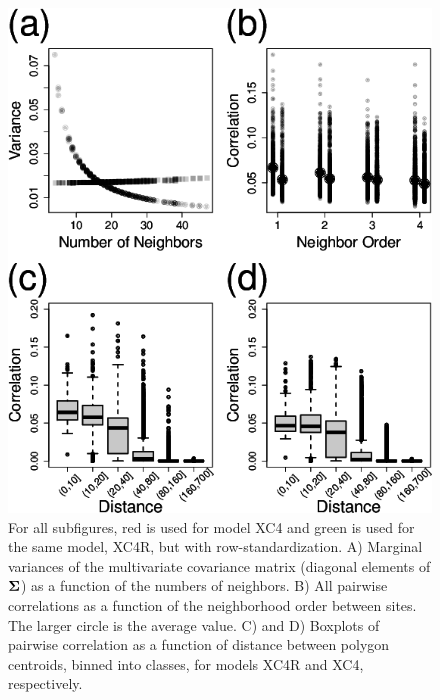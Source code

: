 \documentclass[11pt, titlepage]{article}\usepackage[]{graphicx}\usepackage[]{color}
\renewcommand{\theequation}{eqn \arabic{equation}}
\begin{document}
\begin{figure}[H]
  \begin{center}
  \includegraphics[width=.8\linewidth]{figure/Fig-MargVar.png}
  \end{center}
  \caption{For all subfigures, red is used for model XC4 and green is used for the same model, XC4R, but with row-standardization.  A) Marginal variances of the multivariate covariance matrix (diagonal elements of $\mbox{\boldmath $\Sigma$}$) as a function of the numbers of neighbors. B) All pairwise correlations as a function of the neighborhood order between sites.  The larger circle is the average value. C) and D) Boxplots of pairwise correlation as a function of distance between polygon centroids, binned into classes, for models XC4R and XC4, respectively. \label{Fig-MargVar}}     
\end{figure}





\clearpage
\setcounter{equation}{0}
\renewcommand{\theequation}{A.\arabic{equation}}
\setcounter{figure}{0}
\renewcommand{\thefigure}{A.\arabic{figure}}
\end{document}

